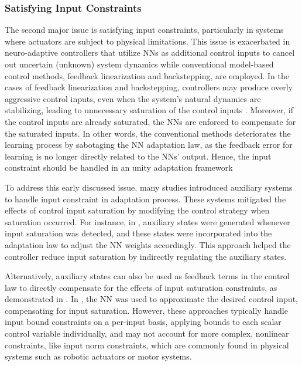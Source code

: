 \documentclass[journal]{IEEEtran}
\begin{document}
\hfill

\subsubsection{Satisfying Input Constraints}

The second major issue is satisfying input constraints, particularly in systems where actuators are subject to physical limitations. 
This issue is exacerbated in neuro-adaptive controllers that utilize NNs as additional control inputs to cancel out uncertain (unknown) system dynamics while conventional model-based control methods, \eg feedback linearization and backstepping, are employed. 
In the cases of feedback linearization and backstepping, controllers may produce overly aggressive control inputs, even when the system's natural dynamics are stabilizing, leading to unnecessary saturation of the control inputs \cite{Khalil:2002aa}.
Moreover, if the control inputs are already saturated, the NNs are enforced to compensate for the saturated inputs.
In other words, the conventional methods deteriorates the learning process by sabotaging the NN adaptation law, as the feedback error for learning is no longer directly related to the NNs' output.
Hence, the input constraint should be handled in an unity adaptation framework 

To address this early discussed issue, many studies introduced auxiliary systems to handle input constraint in adaptation process. 
These systems mitigated the effects of control input saturation by modifying the control strategy when saturation occurred. 
For instance, in \cite{Esfandiari:2014aa,Karason:1994aa,Esfandiari:2015aa}, auxiliary states were generated whenever input saturation was detected, and these states were incorporated into the adaptation law to adjust the NN weights accordingly. 
This approach helped the controller reduce input saturation by indirectly regulating the auxiliary states.

Alternatively, auxiliary states can also be used as feedback terms in the control law to directly compensate for the effects of input saturation constraints, as demonstrated in \cite{Arefinia:2020aa,He:2016aa,Peng:2020aa}. 
In \cite{Gao:2006aa}, the NN was used to approximate the desired control input, compensating for input saturation. 
However, these approaches typically handle input bound constraints on a per-input basis, \ie applying bounds to each scalar control variable individually, and may not account for more complex, nonlinear constraints, like input norm constraints, which are commonly found in physical systems such as robotic actuators or motor systems.
\end{document}
